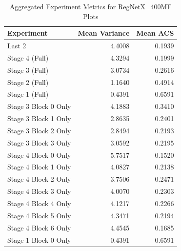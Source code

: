 \begin{table}
\caption{Aggregated Experiment Metrics for RegNetX_400MF Plots}
\label{tab:exp_plot_data_regnetx_400mf}
\begin{tabular}{lrr}
\toprule
Experiment & Mean Variance & Mean ACS \\
\midrule
Last 2 & 4.4008 & 0.1939 \\
Stage 4 (Full) & 4.3294 & 0.1999 \\
Stage 3 (Full) & 3.0734 & 0.2616 \\
Stage 2 (Full) & 1.1640 & 0.4914 \\
Stage 1 (Full) & 0.4391 & 0.6591 \\
Stage 3 Block 0 Only & 4.1883 & 0.3410 \\
Stage 3 Block 1 Only & 2.8635 & 0.2401 \\
Stage 3 Block 2 Only & 2.8494 & 0.2193 \\
Stage 3 Block 3 Only & 3.0592 & 0.2195 \\
Stage 4 Block 0 Only & 5.7517 & 0.1520 \\
Stage 4 Block 1 Only & 4.0827 & 0.2138 \\
Stage 4 Block 2 Only & 3.7506 & 0.2471 \\
Stage 4 Block 3 Only & 4.0070 & 0.2303 \\
Stage 4 Block 4 Only & 4.1217 & 0.2266 \\
Stage 4 Block 5 Only & 4.3471 & 0.2194 \\
Stage 4 Block 6 Only & 4.4545 & 0.1685 \\
Stage 1 Block 0 Only & 0.4391 & 0.6591 \\
\bottomrule
\end{tabular}
\end{table}
